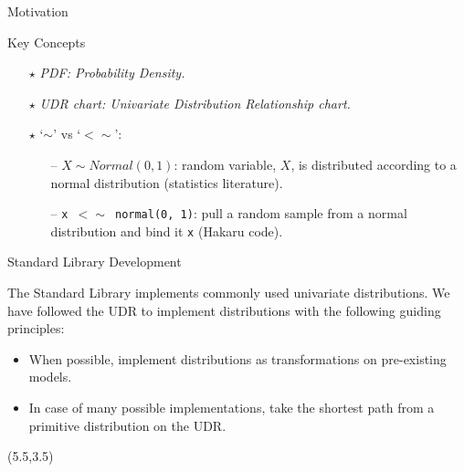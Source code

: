 \documentclass[22pt]{beamer}
\begin{document}
\begin{frame}[fragile]
\begin{textblock}{5}
\begin{block}{\Large{Motivation}}
\end{block}



\begin{block}{\Large{Key Concepts}}
\justifying

\small{
\begin{itemize}
  \item[\textbf{$\star$}] \textit{PDF: Probability Density.}
  \item[\textbf{$\star$}] \textit{UDR chart: Univariate Distribution Relationship chart.}
  \item[\textbf{$\star$}] `{\textbf{$\sim$}}' vs `{\textbf{$<\sim$}}':
      \begin{itemize}
          \small
          \item[--] \small{$X \sim Normal(0, 1)$: random variable, $X$, is distributed according to a normal distribution (statistics literature).}
          \item[--] \small{{\tt \small{x $<\sim$ normal(0, 1)}}: pull a random sample from a normal distribution and bind it {\tt \small{x}} (Hakaru code).}
      \end{itemize}

\end{itemize}
}
\end{block}

\begin{block}{\Large{Standard Library Development}}

\small{The Standard Library implements commonly used univariate distributions. We have followed the UDR to implement distributions with the following guiding principles:


\small{

\bigskip
\begin{itemize}
  \item When possible, implement distributions as transformations on pre-existing models.
  \item In case of many possible implementations, take the shortest path from a primitive distribution on the UDR.
\end{itemize}
        }
}

\end{block}


\begin{textblock}{5}(5.5,3.5)





\end{textblock}
\end{textblock}
\end{frame}
\end{document}

